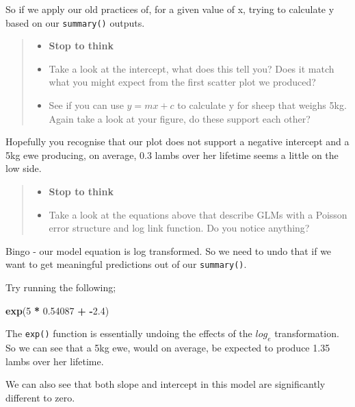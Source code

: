 \documentclass[
]{book}
\newenvironment{Shaded}{\begin{snugshade}}{\end{snugshade}}
\newcommand{\DecValTok}[1]{\textcolor[rgb]{0.00,0.00,0.81}{#1}}
\newcommand{\FloatTok}[1]{\textcolor[rgb]{0.00,0.00,0.81}{#1}}
\newcommand{\FunctionTok}[1]{\textcolor[rgb]{0.13,0.29,0.53}{\textbf{#1}}}
\newcommand{\NormalTok}[1]{#1}
\newcommand{\SpecialCharTok}[1]{\textcolor[rgb]{0.81,0.36,0.00}{\textbf{#1}}}
\providecommand{\tightlist}{%
  \setlength{\itemsep}{0pt}\setlength{\parskip}{0pt}}
\begin{document}
So if we apply our old practices of, for a given value of x, trying to calculate y based on our \texttt{summary()} outputs.

\begin{quote}
\begin{itemize}
\tightlist
\item
  \textbf{Stop to think}
\item
  Take a look at the intercept, what does this tell you? Does it match what you might expect from the first scatter plot we produced?
\item
  See if you can use \(y=mx+c\) to calculate y for sheep that weighs 5kg. Again take a look at your figure, do these support each other?
\end{itemize}
\end{quote}

Hopefully you recognise that our plot does not support a negative intercept and a 5kg ewe producing, on average, 0.3 lambs over her lifetime seems a little on the low side.

\begin{quote}
\begin{itemize}
\tightlist
\item
  \textbf{Stop to think}
\item
  Take a look at the equations above that describe GLMs with a Poisson error structure and log link function. Do you notice anything?
\end{itemize}
\end{quote}

Bingo - our model equation is log transformed. So we need to undo that if we want to get meaningful predictions out of our \texttt{summary()}.

Try running the following;

\begin{Shaded}
\begin{Highlighting}[]
\FunctionTok{exp}\NormalTok{(}\DecValTok{5} \SpecialCharTok{*} \FloatTok{0.54087} \SpecialCharTok{+} \SpecialCharTok{{-}}\FloatTok{2.4}\NormalTok{)}
\end{Highlighting}
\end{Shaded}

The \texttt{exp()} function is essentially undoing the effects of the \(log_e\) transformation. So we can see that a 5kg ewe, would on average, be expected to produce 1.35 lambs over her lifetime.

We can also see that both slope and intercept in this model are significantly different to zero.
\end{document}
